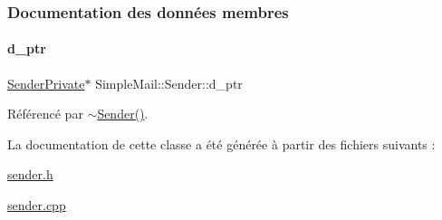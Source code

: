 \subsubsection{Documentation des données membres}
\mbox{\label{class_simple_mail_1_1_sender_a0616c34e23dc61b19e5f50f43000669b}} 
\paragraph{\texorpdfstring{d\+\_\+ptr}{d\_ptr}}
{\footnotesize\ttfamily \hyperlink{class_simple_mail_1_1_sender_private}{Sender\+Private}$\ast$ Simple\+Mail\+::\+Sender\+::d\+\_\+ptr\hspace{0.3cm}{\ttfamily [protected]}}



Référencé par \hyperlink{class_simple_mail_1_1_sender_a99dd9c6aa7d546320d619aca9067fdc6}{$\sim$\+Sender()}.



La documentation de cette classe a été générée à partir des fichiers suivants \+:\begin{DoxyCompactItemize}
\item 
\hyperlink{sender_8h}{sender.\+h}\item 
\hyperlink{sender_8cpp}{sender.\+cpp}\end{DoxyCompactItemize}
